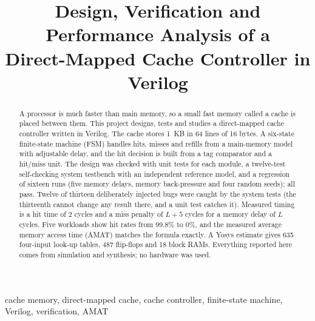 \documentclass[conference]{IEEEtran}
\begin{document}
\title{Design, Verification and Performance Analysis of a\\Direct-Mapped Cache Controller in Verilog}

\author{
}

\maketitle

\begin{abstract}
A processor is much faster than main memory, so a small fast memory called a cache is placed between them. This project designs, tests and studies a direct-mapped cache controller written in Verilog. The cache stores 1~KB in 64 lines of 16 bytes. A six-state finite-state machine (FSM) handles hits, misses and refills from a main-memory model with adjustable delay, and the hit decision is built from a tag comparator and a hit/miss unit. The design was checked with unit tests for each module, a twelve-test self-checking system testbench with an independent reference model, and a regression of sixteen runs (five memory delays, memory back-pressure and four random seeds); all pass. Twelve of thirteen deliberately injected bugs were caught by the system tests (the thirteenth cannot change any result there, and a unit test catches it). Measured timing is a hit time of 2 cycles and a miss penalty of $L+5$ cycles for a memory delay of $L$ cycles. Five workloads show hit rates from 99.8\% to 0\%, and the measured average memory access time (AMAT) matches the formula exactly. A Yosys estimate gives 635 four-input look-up tables, 487 flip-flops and 18 block RAMs. Everything reported here comes from simulation and synthesis; no hardware was used.
\end{abstract}

\begin{IEEEkeywords}
cache memory, direct-mapped cache, cache controller, finite-state machine, Verilog, verification, AMAT
\end{IEEEkeywords}
\end{document}
